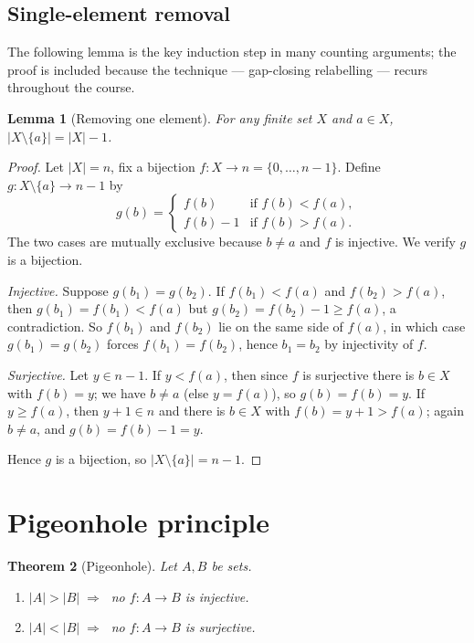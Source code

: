 \documentclass[11pt]{article}
\theoremstyle{defstyle}
\theoremstyle{thmstyle}
\newtheorem{theorem}{Theorem}[section]
\newtheorem{lemma}[theorem]{Lemma}
\theoremstyle{notstyle}
\theoremstyle{cautionstyle}
\newcommand{\card}[1]{\lvert #1 \rvert}
\begin{document}
\subsection{Single-element removal}

The following lemma is the key induction step in many counting
arguments; the proof is included because the technique --- gap-closing
relabelling --- recurs throughout the course.

\begin{thmbox}
\begin{lemma}[Removing one element]
For any finite set $X$ and $a \in X$, $\card{X \setminus \{a\}} = \card{X} - 1$.
\end{lemma}
\begin{proof}
Let $\card{X} = n$, fix a bijection $f \colon X \to n = \{0, \ldots, n-1\}$.
Define $g \colon X \setminus \{a\} \to n - 1$ by
\[
  g(b) = \begin{cases} f(b) & \text{if } f(b) < f(a), \\
                       f(b) - 1 & \text{if } f(b) > f(a). \end{cases}
\]
The two cases are mutually exclusive because $b \neq a$ and $f$ is
injective.  We verify $g$ is a bijection.

\smallskip
\textit{Injective.}\;
Suppose $g(b_1) = g(b_2)$.  If $f(b_1) < f(a)$ and $f(b_2) > f(a)$, then
$g(b_1) = f(b_1) < f(a)$ but $g(b_2) = f(b_2) - 1 \geq f(a)$, a
contradiction.  So $f(b_1)$ and $f(b_2)$ lie on the same side of $f(a)$,
in which case $g(b_1) = g(b_2)$ forces $f(b_1) = f(b_2)$, hence $b_1 = b_2$
by injectivity of $f$.

\smallskip
\textit{Surjective.}\;
Let $y \in n - 1$.  If $y < f(a)$, then since $f$ is surjective there is
$b \in X$ with $f(b) = y$; we have $b \neq a$ (else $y = f(a)$), so
$g(b) = f(b) = y$.  If $y \geq f(a)$, then $y + 1 \in n$ and there is
$b \in X$ with $f(b) = y+1 > f(a)$; again $b \neq a$, and
$g(b) = f(b) - 1 = y$.

\smallskip
Hence $g$ is a bijection, so $\card{X \setminus \{a\}} = n - 1$.
\end{proof}
\end{thmbox}

\section{Pigeonhole principle}

\begin{thmbox}
\begin{theorem}[Pigeonhole]
Let $A, B$ be sets.
\begin{enumerate}[label=\textnormal{(\roman*)}, leftmargin=2em, itemsep=2pt]
  \item $\card{A} > \card{B} \;\Rightarrow\;$ no $f \colon A \to B$ is injective.
  \item $\card{A} < \card{B} \;\Rightarrow\;$ no $f \colon A \to B$ is surjective.
\end{enumerate}
\end{theorem}
\end{thmbox}
\end{document}
